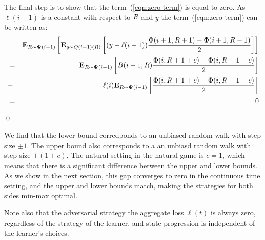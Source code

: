 \documentclass{article}[12pt]
\begin{document}
\begin{enumerate}
The final step is to show that the term~(\ref{eqn:zero-term}) is equal
to zero. As $\ell(i-1)$ is a constant with respect to $R$ and $y$ the
term~(\ref{eqn:zero-term}) can be written as:
\begin{eqnarray}
&&{\bf E}_{R \sim {\bf \Psi}(i-1)}\left[ {\bf E}_{y \sim Q(i-1)(R)}\left[ (y-\ell(i-1))
   \frac{\Phi(i+1,R+1)-\Phi(i+1,R-1)}{2} \right] \right]\\
&=&
{\bf E}_{R \sim {\bf \Psi}(i-1)}\left[ B(i-1,R)
    \frac{\Phi(i,R+1+c)-\Phi(i,R-1-c)}{2} \right]\\
  &-& \ell(i) {\bf E}_{R \sim {\bf \Psi}(i-1)}\left[ 
    \frac{\Phi(i,R+1+c)-\Phi(i,R-1-c)}{2} \right]\\
  &=& 0
\end{eqnarray}
\end{enumerate}
\qed

  We find that the lower bound corredponds to an unbiased random
  walk with step size $\pm 1$. The upper bound also corresponds to a an
  unbiasd random walk with step size $\pm(1+c)$. The natural setting
  in the natural game is $c=1$, which means that there is a
  significant difference between the upper and lower bounds. As we
  show in the next section, this gap converges to zero in the
  continuous time setting, and the upper and lower bounds match,
  making the strategies for both sides min-max optimal. 

  Note also that the adversarial strategy the aggregate loss
  $\ell(t)$ is always zero, regardless of the strategy of the
  learner, and state progression is independent of the
  learner's choices.
\end{document}
